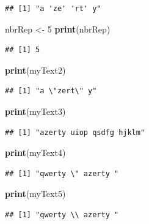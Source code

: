\documentclass[twoside,symmetric]{book}
\newenvironment{Shaded}{}{}
\newcommand{\DecValTok}[1]{#1}
\newcommand{\KeywordTok}[1]{\textbf{#1}}
\newcommand{\NormalTok}[1]{#1}
\newcommand{\StringTok}[1]{#1}
\begin{document}
\begin{verbatim}
## [1] "a 'ze' 'rt' y"
\end{verbatim}

\begin{Shaded}
\begin{Highlighting}[]
\NormalTok{nbrRep <-}\StringTok{ }\DecValTok{5}
\KeywordTok{print}\NormalTok{(nbrRep)}
\end{Highlighting}
\end{Shaded}

\begin{verbatim}
## [1] 5
\end{verbatim}

\begin{Shaded}
\begin{Highlighting}[]
\KeywordTok{print}\NormalTok{(myText2)}
\end{Highlighting}
\end{Shaded}

\begin{verbatim}
## [1] "a \"zert\" y"
\end{verbatim}

\begin{Shaded}
\begin{Highlighting}[]
\KeywordTok{print}\NormalTok{(myText3)}
\end{Highlighting}
\end{Shaded}

\begin{verbatim}
## [1] "azerty uiop qsdfg hjklm"
\end{verbatim}

\begin{Shaded}
\begin{Highlighting}[]
\KeywordTok{print}\NormalTok{(myText4)}
\end{Highlighting}
\end{Shaded}

\begin{verbatim}
## [1] "qwerty \" azerty "
\end{verbatim}

\begin{Shaded}
\begin{Highlighting}[]
\KeywordTok{print}\NormalTok{(myText5)}
\end{Highlighting}
\end{Shaded}

\begin{verbatim}
## [1] "qwerty \\ azerty "
\end{verbatim}
\end{document}
